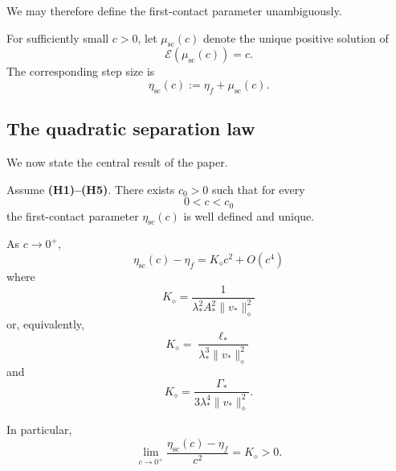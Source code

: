 We may therefore define the first-contact parameter unambiguously.

\begin{definition}
\label{def:first-contact}
For sufficiently small $c>0$, let
$\mu_{\mathrm{sc}}(c)$ denote the unique positive solution of
\begin{equation}
\mathscr E(\mu_{\mathrm{sc}}(c))=c.
\label{eq:mu-sc-definition}
\end{equation}
The corresponding step size is
\begin{equation}
\eta_{\mathrm{sc}}(c)
:=
\eta_f+\mu_{\mathrm{sc}}(c).
\label{eq:eta-sc-definition}
\end{equation}
\end{definition}

\subsection{The quadratic separation law}
\label{subsec:quadratic-separation}

We now state the central result of the paper.

\begin{theorem}
\label{thm:quadratic-separation}
Assume \textbf{(H1)--(H5)}.
There exists $c_0>0$ such that for every
\[
0<c<c_0
\]
the first-contact parameter
$\eta_{\mathrm{sc}}(c)$ is well defined and unique.

As $c\to0^+$,
\begin{equation}
\boxed{
\eta_{\mathrm{sc}}(c)-\eta_f
=
K_\diamond c^2
+
O(c^4)
}
\label{eq:main-separation-law}
\end{equation}
where
\begin{equation}
\boxed{
K_\diamond
=
\frac{1}{
\lambda_*^2A_*^2
\|v_*\|_\diamond^2
}
}
\label{eq:K-A}
\end{equation}
or, equivalently,
\begin{equation}
\boxed{
K_\diamond
=
\frac{\ell_*}{
\lambda_*^3
\|v_*\|_\diamond^2
}
}
\label{eq:K-ell}
\end{equation}
and
\begin{equation}
\boxed{
K_\diamond
=
\frac{\Gamma_*}{
3\lambda_*^4
\|v_*\|_\diamond^2
}.
}
\label{eq:K-Gamma}
\end{equation}

In particular,
\begin{equation}
\lim_{c\to0^+}
\frac{
\eta_{\mathrm{sc}}(c)-\eta_f
}{
c^2
}
=
K_\diamond>0.
\label{eq:K-limit}
\end{equation}
\end{theorem}

